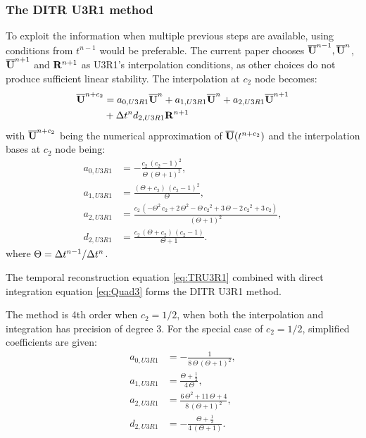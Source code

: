 \subsubsection{The DITR U3R1 method}

To exploit the information when multiple previous
steps are available,
using conditions from $t^{n-1}$ would be
preferable.
The current paper chooses $\overline{\mathbf{U}}^{n-1},\overline{\mathbf{U}}^{n}$, $\overline{\mathbf{U}}^{n+1}$
and $\mathbf{R}^{n+1}$ as U3R1's interpolation conditions,
as other choices do not produce sufficient linear stability.
The interpolation at $c_2$ node becomes:
\begin{equation}
    \begin{aligned}
        \label{eq:TRU3R1}
        \overline{\mathbf{U}}^{n+c_2} & =
        a_{0,U3R1}\overline{\mathbf{U}}^{n} +
        a_{1,U3R1}\overline{\mathbf{U}}^{n} +
        a_{2,U3R1}\overline{\mathbf{U}}^{n + 1}
        \\ & +
        \mathrm\Delta t^n d_{2,U3R1}\mathbf{R}^{n + 1}
    \end{aligned}
\end{equation}
with $\overline{\mathbf{U}}^{n+c_2}$ being
the numerical approximation
of $\overline{\mathbf{U}}(t^{n+c_2})$
and the interpolation bases at $c_2$ node being:
\begin{equation}
    \begin{aligned}
        a_{0,U3R1} & = -\frac{c_{2}\,{\left(c_{2}-1\right)}^2}{\Theta\,{\left(\Theta+1\right)}^2}       ,                                                      \\
        a_{1,U3R1} & = \frac{\left(\Theta+c_{2}\right)\,{\left(c_{2}-1\right)}^2}{\Theta}                     ,                                                \\
        a_{2,U3R1} & =  \frac{c_{2}\,\left(-\Theta^2\,c_{2}+2\,\Theta^2-\Theta\,{c_{2}}^2+3\,\Theta-2\,{c_{2}}^2+3\,c_{2}\right)}{{\left(\Theta+1\right)}^2} , \\
        d_{2,U3R1} & =   \frac{c_{2}\,\left(\Theta+c_{2}\right)\,\left(c_{2}-1\right)}{\Theta+1}.
    \end{aligned}
    \label{eq:interpU3R1}
\end{equation}
where $\Theta = \mathrm\Delta t^{n-1}/\mathrm\Delta t^{n}$.

The temporal reconstruction equation \eqref{eq:TRU3R1}
combined with direct integration equation \eqref{eq:Quad3}
forms the DITR U3R1 method.

The method is 4th order when $c_2=1/2$, when
both the interpolation and integration has precision
of degree 3.
For the special case of $c_2=1/2$, simplified
coefficients are given:
\begin{equation}
    \begin{aligned}
        a_{0,U3R1} & = -\frac{1}{8\,\Theta\,{\left(\Theta+1\right)}^2}  ,              \\
        a_{1,U3R1} & = \frac{\Theta+\frac{1}{2}}{4\,\Theta}        ,                   \\
        a_{2,U3R1} & =  \frac{6\,\Theta^2+11\,\Theta+4}{8\,{\left(\Theta+1\right)}^2}, \\
        d_{2,U3R1} & = -\frac{\Theta+\frac{1}{2}}{4\,\left(\Theta+1\right)}.
    \end{aligned}
    \label{eq:interpU3R1-S}
\end{equation}

